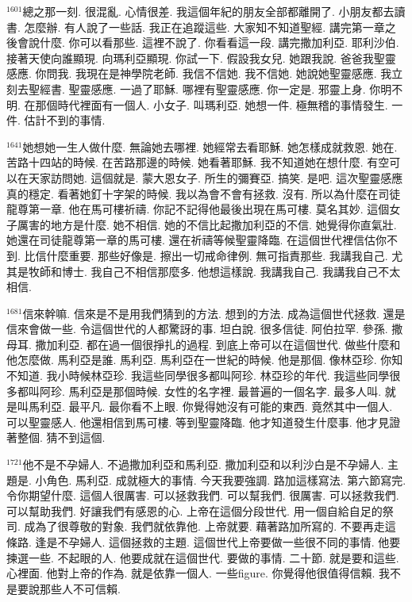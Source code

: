 \documentclass{book}
\begin{document}
$^{1601}$總之那一刻.
很混亂.
心情很差.
我這個年紀的朋友全部都離開了.
小朋友都去讀書.
怎麼辦.
有人說了一些話.
我正在追蹤這些.
大家知不知道聖經.
講完第一章之後會說什麼.
你可以看那些.
這裡不說了.
你看看這一段.
講完撒加利亞.
耶利沙伯.
接著天使向誰顯現.
向瑪利亞顯現.
你試一下.
假設我女兒.
她跟我說.
爸爸我聖靈感應.
你問我.
我現在是神學院老師.
我信不信她.
我不信她.
她說她聖靈感應.
我立刻去聖經書.
聖靈感應.
一過了耶穌.
哪裡有聖靈感應.
你一定是.
邪靈上身.
你明不明.
在那個時代裡面有一個人.
小女子.
叫瑪利亞.
她想一件.
極無稽的事情發生.
一件.
估計不到的事情.

$^{1641}$她想她一生人做什麼.
無論她去哪裡.
她經常去看耶穌.
她怎樣成就救恩.
她在.
苦路十四站的時候.
在苦路那邊的時候.
她看著耶穌.
我不知道她在想什麼.
有空可以在天家訪問她.
這個就是.
蒙大恩女子.
所生的彌賽亞.
搞笑.
是吧.
這次聖靈感應真的穩定.
看著她釘十字架的時候.
我以為會不會有拯救.
沒有.
所以為什麼在司徒龍尊第一章.
他在馬可樓祈禱.
你記不記得他最後出現在馬可樓.
莫名其妙.
這個女子厲害的地方是什麼.
她不相信.
她的不信比起撒加利亞的不信.
她覺得你直氣壯.
她還在司徒龍尊第一章的馬可樓.
還在祈禱等候聖靈降臨.
在這個世代裡信估你不到.
比信什麼重要.
那些好像是.
擦出一切戒命律例.
無可指責那些.
我講我自己.
尤其是牧師和博士.
我自己不相信那麼多.
他想這樣說.
我講我自己.
我講我自己不太相信.

$^{1681}$信來幹嘛.
信來是不是用我們猜到的方法.
想到的方法.
成為這個世代拯救.
還是信來會做一些.
令這個世代的人都驚訝的事.
坦白說.
很多信徒.
阿伯拉罕.
參孫.
撒母耳.
撒加利亞.
都在過一個很掙扎的過程.
到底上帝可以在這個世代.
做些什麼和他怎麼做.
馬利亞是誰.
馬利亞.
馬利亞在一世紀的時候.
他是那個.
像林亞珍.
你知不知道.
我小時候林亞珍.
我這些同學很多都叫阿珍.
林亞珍的年代.
我這些同學很多都叫阿珍.
馬利亞是那個時候.
女性的名字裡.
最普遍的一個名字.
最多人叫.
就是叫馬利亞.
最平凡.
最你看不上眼.
你覺得她沒有可能的東西.
竟然其中一個人.
可以聖靈感人.
他還相信到馬可樓.
等到聖靈降臨.
他才知道發生什麼事.
他才見證著整個.
猜不到這個.

$^{1721}$他不是不孕婦人.
不過撒加利亞和馬利亞.
撒加利亞和以利沙白是不孕婦人.
主題是.
小角色.
馬利亞.
成就極大的事情.
今天我要強調.
路加這樣寫法.
第六節寫完.
令你期望什麼.
這個人很厲害.
可以拯救我們.
可以幫我們.
很厲害.
可以拯救我們.
可以幫助我們.
好讓我們有感恩的心.
上帝在這個分段世代.
用一個自給自足的祭司.
成為了很尊敬的對象.
我們就依靠他.
上帝就要.
藉著路加所寫的.
不要再走這條路.
逢是不孕婦人.
這個拯救的主題.
這個世代上帝要做一些很不同的事情.
他要揀選一些.
不起眼的人.
他要成就在這個世代.
要做的事情.
二十節.
就是要和這些.
心裡面.
他對上帝的作為.
就是依靠一個人.
一些figure.
你覺得他很值得信賴.
我不是要說那些人不可信賴.
\end{document}
